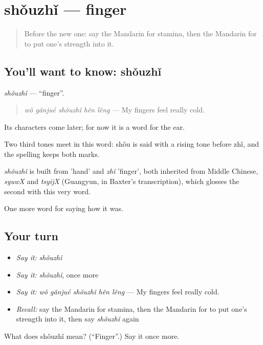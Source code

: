 \section[shǒuzhǐ]{shǒuzhǐ — finger}

\label{lesson:ZH-C474-shouzhi}



\begin{quote}
Before the new one: say the Mandarin for stamina, then the Mandarin for to put one's strength into it.
\end{quote}

\subsection*{You'll want to know: shǒuzhǐ}
\emph{shǒuzhǐ} — \textquotedblleft{}finger\textquotedblright{}.

\begin{quote}
\emph{wǒ gǎnjué shǒuzhǐ hěn lěng} — My fingers feel really cold.
\end{quote}

Its characters come later; for now it is a word for the ear.

Two third tones meet in this word: shǒu is said with a rising tone before zhǐ, and the spelling keeps both marks.

\begin{cousinweb}
\emph{shǒuzhǐ} is built from  'hand' and \emph{zhǐ} 'finger', both inherited from Middle Chinese, \emph{syuwX} and \emph{tsyijX} (Guangyun, in Baxter's transcription), which glosses the second with this very word.
\end{cousinweb}

\begin{grammarlens}[title={What you've built}]
One more word for saying how it was.
\end{grammarlens}

\subsection*{Your turn}
\begin{itemize}
\raggedright
  \item \emph{Say it:} \emph{shǒuzhǐ}
  \item \emph{Say it:} \emph{shǒuzhǐ}, once more
  \item \emph{Say it:} \emph{wǒ gǎnjué shǒuzhǐ hěn lěng} — My fingers feel really cold.
  \item \emph{Recall:} say the Mandarin for stamina, then the Mandarin for to put one's strength into it, then say \emph{shǒuzhǐ} again
\end{itemize}

\begin{tcolorbox}[breakable,colback=teal!4,colframe=teal!35!black,title={Before you move on}]
What does shǒuzhǐ mean? (\textquotedblleft{}Finger\textquotedblright{}.) Say it once more.
\end{tcolorbox}
